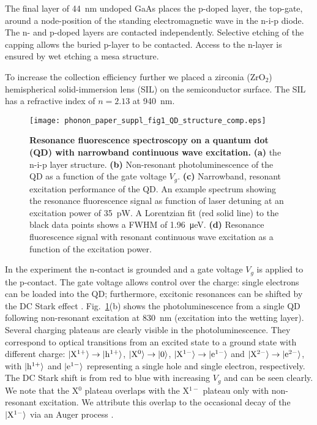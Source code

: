 \documentclass[aps,prl,reprint,superscriptaddress]{revtex4-1}
\begin{document}
The final layer of \SI{44}{\nano\meter} undoped GaAs places the p-doped layer, the top-gate, around a node-position of the standing electromagnetic wave in the n-i-p diode. 
The n- and p-doped layers are contacted independently. Selective etching of the capping allows the buried p-layer to be contacted. Access to the n-layer is ensured by wet etching a mesa structure. 

To increase the collection efficiency further we placed a zirconia (ZrO$_{2}$) hemispherical solid-immersion lens (SIL) on the semiconductor surface. The SIL has a refractive index of $n=2.13$ at \SI{940}{\nano\meter}.

\begin{figure}[b]{}
	\centering
	\texttt{[image: phonon\_paper\_suppl\_fig1\_QD\_structure\_comp.eps]}
	\caption{
	\textbf{Resonance fluorescence spectroscopy on a quantum dot (QD) with narrowband continuous wave excitation.}
	\textbf{(a)} the n-i-p layer structure.
	\textbf{(b)} Non-resonant photoluminescence of the QD as a function of the gate voltage $V_g$.
	\textbf{(c)} Narrowband, resonant excitation performance of the QD. An example spectrum showing the resonance fluorescence signal as function of laser detuning at an excitation power of \SI{35}{\pico\watt}. A Lorentzian fit (red solid line) to the black data points shows a FWHM of \SI{1.96}{\micro\electronvolt}.
	\textbf{(d)} Resonance fluorescence signal with resonant continuous wave excitation as a function of the excitation power.
	}
	\label{fig:sfig1}
\end{figure}


In the experiment the n-contact is grounded and a gate voltage $V_g$ is applied to the p-contact. The gate voltage allows control over the charge: single electrons can be loaded into the QD; furthermore, excitonic resonances can be shifted by the DC Stark effect \cite{Warburton2000,Dalgarno2008,Warburton2013}. Fig.\ \ref{fig:sfig1}(b) shows the photoluminescence from a single QD following non-resonant excitation at \SI{830}{\nano\meter} (excitation into the wetting layer). Several charging plateaus are clearly visible in the photoluminescence. They correspond to optical transitions from an excited state to a ground state with different charge: $\ket{\mathrm{X}^{1+}}\rightarrow\ket{\mathrm{h}^{1+}}$, $\ket{\mathrm{X}^0}\rightarrow\ket{0}$, $\ket{\mathrm{X}^{1-}}\rightarrow\ket{\mathrm{e}^{1-}}$ and $\ket{\mathrm{X}^{2-}}\rightarrow\ket{\mathrm{e}^{2-}}$, with $\ket{\mathrm{h}^{1+}}$ and $\ket{\mathrm{e}^{1-}}$ representing a single hole and single electron, respectively. The DC Stark shift is from red to blue with increasing $V_g$ and can be seen clearly. 
We note that the X$^0$ plateau overlaps with the X$^{1-}$ plateau only with non-resonant excitation. We attribute this overlap to  the occasional decay of the $\ket{\mathrm{X}^{1-}}$ via an Auger process \cite{Kurzmann2016}.
\end{document}
